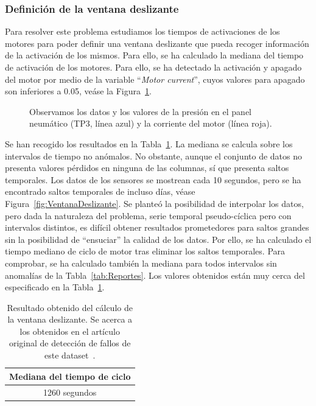 \documentclass[12pt,letterpaper]{article}
\begin{document}
\subsubsection{Definición de la ventana deslizante}

Para resolver este problema estudiamos los tiempos de activaciones de los motores para poder definir una ventana deslizante que pueda recoger información de la activación de los mismos. 
Para ello, se ha calculado la mediana del tiempo de activación de los motores. Para ello, se ha detectado la activación y apagado del motor por medio de la variable ``\textit{Motor current}'', cuyos 
valores para apagado son inferiores a 0.05, veáse la Figura~\ref{fig:VisualizacionDatos}.

\begin{figure}[htp]
        \centering
        \caption{Observamos los datos y los valores de la presión en el panel neumático (TP3, línea azul) y la corriente del motor (línea roja).}
        \label{fig:VisualizacionDatos}
\end{figure}

Se han recogido los resultados en la Tabla~\ref{tab:TiempoCiclo}. La mediana se calcula sobre los intervalos de tiempo no anómalos. No obstante, 
aunque el conjunto de datos no presenta valores pérdidos en ninguna de las columnas, sí que presenta saltos temporales. Los datos de los sensores se mostrean cada 10 segundos, 
pero se ha encontrado saltos temporales de incluso días, véase Figura~\ref{fig:VentanaDeslizante}. Se planteó la posibilidad de interpolar los datos, pero dada la naturaleza 
del problema, serie temporal pseudo-cíclica pero con intervalos distintos, es difícil obtener resultados prometedores para saltos grandes sin la posibilidad de ``ensuciar'' la calidad de los datos.
Por ello, se ha calculado el tiempo mediano de ciclo de motor tras eliminar los saltos temporales. Para comprobar, se ha calculado también la mediana 
para todos intervalos sin anomalías de la Tabla~\ref{tab:Reportes}. Los valores obtenidos están muy cerca del especificado en la Tabla~\ref{tab:TiempoCiclo}.

\begin{table}[htp]
    \centering
    \begin{tabular}{c}
    \hline
    \textbf{Mediana del tiempo de ciclo} \\ \hline 
    1260 segundos\\
    \hline
    \end{tabular}
    \caption{Resultado obtenido del cálculo de la ventana deslizante. Se acerca a los obtenidos en el artículo original de detección de fallos de este dataset~\cite{FailureDetection}.}
    \label{tab:TiempoCiclo}
\end{table}
\end{document}
